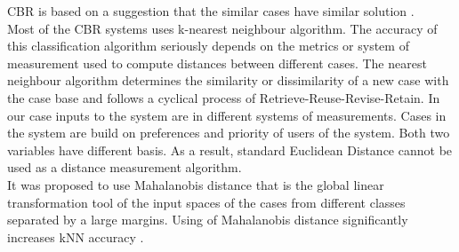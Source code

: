\documentclass{llncs}
\begin{document}
    CBR is based on a suggestion that the similar cases have similar solution \cite{7}.\\
    Most of the CBR systems uses k-nearest neighbour algorithm.
    The accuracy of this classification algorithm seriously depends on the metrics or system of measurement used to compute distances between different cases.
    The nearest neighbour algorithm determines the similarity or dissimilarity of a new case with the case base and follows a cyclical process of Retrieve-Reuse-Revise-Retain.
    In our case inputs to the system are in different systems of measurements.
    Cases in the system are build on preferences and priority of users of the system.
    Both two variables have different basis.
    As a result, standard Euclidean Distance cannot be used as a distance measurement algorithm.\\
    It was proposed to use Mahalanobis distance that is the global linear transformation tool of the input spaces of the cases from different classes separated by a large margins.
    Using of Mahalanobis distance significantly increases kNN accuracy \cite{17}.\\
\end{document}
